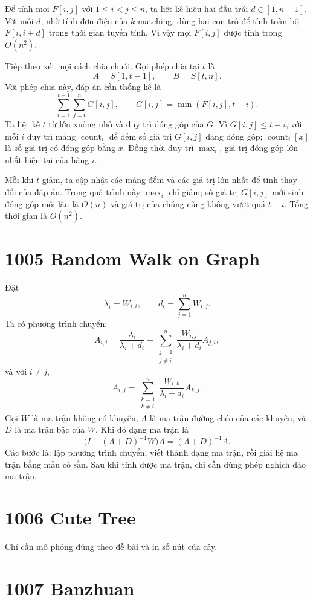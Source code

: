 \documentclass[11pt]{article}
\begin{document}
Để tính mọi $F[i,j]$ với $1\le i<j\le n$, ta liệt kê hiệu hai đầu trái
$d\in[1,n-1]$. Với mỗi $d$, nhờ tính đơn điệu của $k$-matching, dùng hai con
trỏ để tính toàn bộ $F[i,i+d]$ trong thời gian tuyến tính. Vì vậy mọi
$F[i,j]$ được tính trong $O(n^2)$.

Tiếp theo xét mọi cách chia chuỗi. Gọi phép chia tại $t$ là
\[
  A=S[1,t-1],\qquad B=S[t,n].
\]
Với phép chia này, đáp án cần thống kê là
\[
  \sum_{i=1}^{t-1}\sum_{j=t}^{n}G[i,j],
  \qquad
  G[i,j]=\min(F[i,j],t-i).
\]
Ta liệt kê $t$ từ lớn xuống nhỏ và duy trì đóng góp của $G$. Vì
$G[i,j]\le t-i$, với mỗi $i$ duy trì mảng $\operatorname{count}_i$ để đếm số
giá trị $G[i,j]$ đang đóng góp; $\operatorname{count}_i[x]$ là số giá trị có
đóng góp bằng $x$. Đồng thời duy trì $\operatorname{max}_i$, giá trị đóng góp
lớn nhất hiện tại của hàng $i$.

Mỗi khi $t$ giảm, ta cập nhật các mảng đếm và các giá trị lớn nhất để tính
thay đổi của đáp án. Trong quá trình này $\operatorname{max}_i$ chỉ giảm; số
giá trị $G[i,j]$ mới sinh đóng góp mỗi lần là $O(n)$ và giá trị của chúng
cũng không vượt quá $t-i$. Tổng thời gian là $O(n^2)$.

\section{1005 Random Walk on Graph}

Đặt
\[
  \lambda_i=W_{i,i},\qquad d_i=\sum_{j=1}^{n} W_{i,j}.
\]
Ta có phương trình chuyển:
\[
  A_{i,i}
  =
  \frac{\lambda_i}{\lambda_i+d_i}
  +
  \sum_{\substack{j=1\\j\ne i}}^{n}
  \frac{W_{i,j}}{\lambda_i+d_i}A_{j,i},
\]
và với $i\ne j$,
\[
  A_{i,j}
  =
  \sum_{\substack{k=1\\k\ne i}}^{n}
  \frac{W_{i,k}}{\lambda_i+d_i}A_{k,j}.
\]
Gọi $W$ là ma trận không có khuyên, $\Lambda$ là ma trận đường chéo của các
khuyên, và $D$ là ma trận bậc của $W$. Khi đó dạng ma trận là
\[
  \bigl(I-(\Lambda+D)^{-1}W\bigr)A=(\Lambda+D)^{-1}\Lambda.
\]
Các bước là: lập phương trình chuyển, viết thành dạng ma trận, rồi giải hệ
ma trận bằng mẫu có sẵn. Sau khi tính được ma trận, chỉ cần dùng phép nghịch
đảo ma trận.

\section{1006 Cute Tree}

Chỉ cần mô phỏng đúng theo đề bài và in số nút của cây.

\section{1007 Banzhuan}
\end{document}
